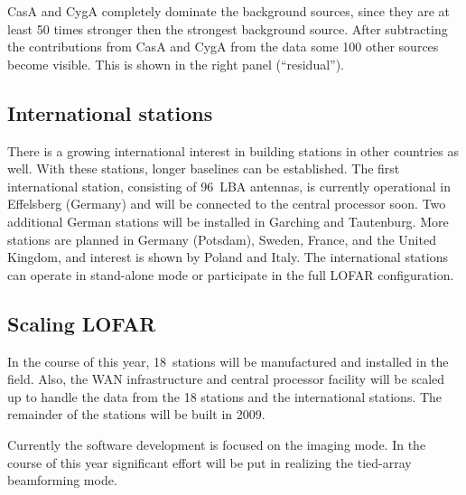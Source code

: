 \documentclass[journal]{IEEEtran}
\begin{document}
CasA and CygA completely dominate the background sources, since they are at least 50 times stronger then the strongest background source. After subtracting the contributions from CasA and CygA from the data some 100 other sources become visible. This is shown in the right panel (``residual''). 

\subsection{International stations}
There is a growing international interest in building stations in other
countries as well.
With these stations, longer baselines can be established.
The first international station, consisting of 96~LBA antennas, is currently
operational in Effelsberg (Germany) and will be connected to the central
processor soon.
Two additional German stations will be installed in Garching and Tautenburg.
More stations are planned in Germany (Potsdam), Sweden, France, and the
United Kingdom, and interest is shown by Poland and Italy.
The international stations can operate in stand-alone mode or participate
in the full LOFAR configuration.

\subsection{Scaling LOFAR}
In the course of this year, 18~stations will be manufactured and installed in the field. Also, the WAN infrastructure and central processor facility will be scaled up to handle the data from the 18 stations and the international stations.
The remainder of the stations will be built in 2009.

Currently the software development is focused on the imaging mode.
In the course of this year significant effort will be put in realizing the
tied-array beamforming mode.



%
\end{document}
